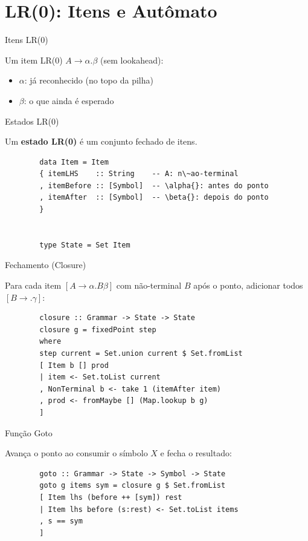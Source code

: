 \section{LR(0): Itens e Autômato}\label{lr0-itens-e-autuxf4mato}

\begin{frame}{Itens LR(0)}

    Um item LR(0) \(A \to \alpha . \beta\) (sem lookahead):

    \begin{itemize}

        \item
        \(\alpha\): já reconhecido (no topo da pilha)
        \item
        \(\beta\): o que ainda é esperado
    \end{itemize}
\end{frame}

\begin{frame}[fragile]{Estados LR(0)}

    Um \textbf{estado LR(0)} é um conjunto fechado de itens.

    \begin{lstlisting}
        data Item = Item
        { itemLHS    :: String    -- A: n\~ao-terminal
        , itemBefore :: [Symbol]  -- \alpha{}: antes do ponto
        , itemAfter  :: [Symbol]  -- \beta{}: depois do ponto
        }


        type State = Set Item
    \end{lstlisting}
\end{frame}

\begin{frame}[fragile]{Fechamento (Closure)}

    Para cada item \([A \to \alpha . B \beta]\) com não-terminal \(B\) após
    o ponto, adicionar todos \([B \to . \gamma]\):

    \begin{lstlisting}
        closure :: Grammar -> State -> State
        closure g = fixedPoint step
        where
        step current = Set.union current $ Set.fromList
        [ Item b [] prod
        | item <- Set.toList current
        , NonTerminal b <- take 1 (itemAfter item)
        , prod <- fromMaybe [] (Map.lookup b g)
        ]
    \end{lstlisting}
\end{frame}

\begin{frame}[fragile]{Função Goto}

    Avança o ponto ao consumir o símbolo \(X\) e fecha o resultado:

    \begin{lstlisting}
        goto :: Grammar -> State -> Symbol -> State
        goto g items sym = closure g $ Set.fromList
        [ Item lhs (before ++ [sym]) rest
        | Item lhs before (s:rest) <- Set.toList items
        , s == sym
        ]
    \end{lstlisting}
\end{frame}

